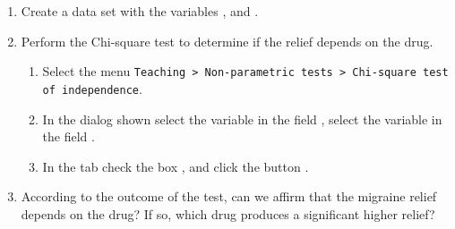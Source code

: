 \begin{enumerate}[leftmargin=*]
\begin{enumerate}
\item Create a data set with the variables , and .

\item Perform the Chi-square test to determine if the relief depends on the drug.  
\begin{indication}
\begin{enumerate}
\item Select the menu \texttt{Teaching > Non-parametric tests > Chi-square test of inde\-pendence}.
\item In the dialog shown select the variable  in the field , select the variable  in the field .
\item In the  tab check the box , and click the button .
\end{enumerate}
\end{indication}

\item According to the outcome of the test, can we affirm that the migraine relief depends on the drug? If so, which drug produces a significant higher relief?
\end{enumerate}

\end{enumerate}


